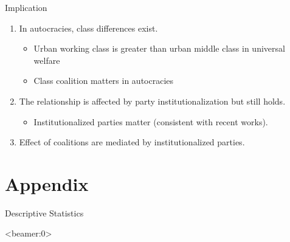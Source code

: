 \documentclass{Bredelebeamer}
\begin{document}
\begin{frame}{Implication}
	\begin{enumerate}
		\item In autocracies, class differences exist.\pause
		\begin{itemize}
			\item Urban working class is greater than urban middle class in universal welfare
			\item Class coalition matters in autocracies\pause
		\end{itemize}
		\item The relationship is affected by party institutionalization but still holds.\pause
		\begin{itemize}
			\item Institutionalized parties matter (consistent with recent works).\pause
		\end{itemize}
		\item Effect of coalitions are mediated by institutionalized parties.
	\end{enumerate}
\end{frame}

\section{Appendix}
\begin{frame}{Descriptive Statistics}

\end{frame}

\begin{frame}<beamer:0>
	
	
\end{frame}
\end{document}
